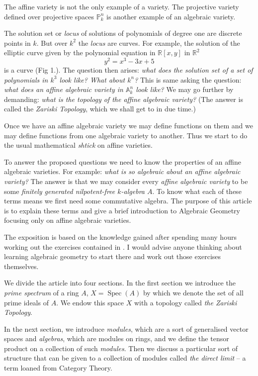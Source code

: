 \documentclass[]{report}
\DeclareMathOperator\Spec{Spec}
\begin{document}
The affine variety is not the only example of a variety. The projective variety defined over projective spaces $\mathbb{P}^n_k$ is another example of an algebraic variety.

The solution set or \textit{locus} of solutions of polynomials of degree one are discrete points in $k$. But over $k^2$ the \textit{locus} are curves. For example, the solution of the elliptic curve given by the polynomial equation in $\mathbb{R}[x,y]$ in $\mathbb{R}^2$  
    $$y^2 = x^3 - 3x + 5$$
    is a curve (Fig 1.). The question then arises: \textit{what does the solution set of a set of polynomials in $k^3$ look like? What about $k^n$?} This is same asking the question: \textit{what does an affine algebraic variety in $\mathbb{A}^n_k$ look like?} We may go further by demanding: \textit{what is the topology of the affine algebraic variety?} (The answer is called the \textit{Zariski Topology}, which we shall get to in due time.)

    Once we have an affine algebraic variety we may define functions on them and we may define functions from one algebraic variety to another. Thus we start to do the usual mathematical \textit{shtick} on affine varieties.

    To answer the proposed questions we need to know the properties of an affine algebraic varieties. For example: \textit{what is so algebraic about an affine algebraic variety?} The answer is that we may consider every \textit{affine algebraic variety} to be some \textit{finitely generated nilpotent-free $k$-algebra $A$}. To know what each of these terms means we first need some commutative algebra. The purpose of this article is to explain these terms and give a brief introduction to Algebraic Geometry focusing only on affine algebraic varieties.

    The exposition is based on the knowledge gained after spending many hours working out the exercises contained in \cite{atiyah1}. I would advise anyone thinking about learning algebraic geometry to start there and work out those exercises themselves.  

    We divide the article into four sections. In the first section we introduce the \textit{prime spectrum} of a ring $A$, $X = \Spec(A)$ by which we denote the set of all prime ideals of $A$. We endow this space $X$ with a topology called \textit{the Zariski Topology}.

    In the next section, we introduce \textit{modules}, which are a sort of generalised vector spaces and \textit{algebras}, which are modules on rings, and we define the tensor product on a collection of such \textit{modules}. Then we discuss a particular sort of structure that can be given to a collection of modules called \textit{the direct limit} -- a term loaned from Category Theory. 
\end{document}
